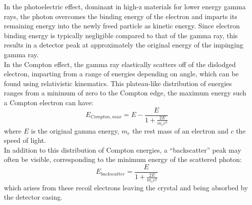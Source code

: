 \documentclass[12pt]{article}
\begin{document}
In the photoelectric effect, dominant in high-z materials for lower energy gamma rays, the photon overcomes the binding energy of the electron and imparts its remaining energy into the newly freed particle as kinetic energy.
Since electron binding energy is typically negligible compared to that of the gamma ray, this results in a detector peak at approximately the original energy of the impinging gamma ray.\\

In the Compton effect, the gamma ray elastically scatters off of the dislodged electron, imparting from a range of energies depending on angle, which can be found using relativistic kinematics.
This plateau-like distribution of energies ranges from a minimum of zero to the Compton edge, the maximum energy such a Compton electron can have\cite{npre_lab_6_manual_2025}:
\begin{equation}\label{eq:comp-edge}
    E_{Compton, max} = E - \frac{E}{1+\frac{2E}{m_ec^2}}
\end{equation}
where $E$ is the original gamma energy, $m_e$ the rest mass of an electron and $c$ the speed of light.\\

In addition to this distribution of Compton energies, a ``backscatter'' peak may often be visible, corresponding to the minimum energy of the scattered photon\cite{npre_lab_6_manual_2025}:
\begin{equation}
    \label{eq:backscat}
    E_{backscatter} = \frac{E}{1+\frac{2E}{m_ec^2}}
\end{equation}
which arises from these recoil electrons leaving the crystal and being absorbed by the detector casing.\\
\end{document}
